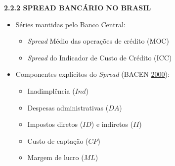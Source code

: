 \documentclass[ignorenonframetext,aspectratio=169,ignorenonframetext]{beamer}
\begin{document}
\begin{frame}{\textbf{2.2.2 SPREAD BANCÁRIO NO BRASIL}}
\protect\hypertarget{spread-bancuxe1rio-no-brasil}{}

\begin{itemize}
\item
  Séries mantidas pelo Banco Central:

  \begin{itemize}
  \item
    \emph{Spread} Médio das operações de crédito (MOC)
  \item
    \emph{Spread} do Indicador de Custo de Crédito (ICC)
  \end{itemize}
\item
  Componentes explícitos do \emph{Spread} (BACEN
  \protect\hyperlink{ref-BCB:2000}{2000}):

  \begin{itemize}
  \item
    Inadimplência (\(Ind\))
  \item
    Despesas administrativas (\(DA\))
  \item
    Impostos diretos (\(ID\)) e indiretos (\(II\))
  \item
    Custo de captação (\(CP\))
  \item
    Margem de lucro (\(ML\))
  \end{itemize}
\end{itemize}

\end{frame}
\end{document}
